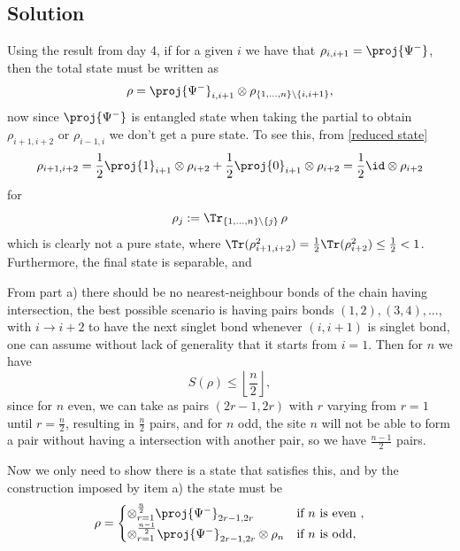 \subsection*{Solution}

\begin{solution}[Part (a)]
Using the result from day 4, if for a given $i$ we have that $\rho_{i,i+1}=\proj{\Psi^{-}}$, then the total state must be written as \begin{equation}
    \rho = \proj{\Psi^{-}}_{i,i+1} \otimes \rho_{\{1,\dots,n\}\setminus\{i,i+1\}},
    \label{reduced state}
\end{equation} now since $\proj{\Psi^{-}}$ is entangled state when taking the partial to obtain $\rho_{i+1,i+2}$ or $\rho_{i-1,i}$ we don't get a pure state. To see this, from \eqref{reduced state}
\begin{equation}
    \rho_{i+1,i+2} = \frac{1}{2}\proj{1}_{i+1} \otimes \rho_{i+2} + \frac{1}{2}\proj{0}_{i+1} \otimes \rho_{i+2} = \frac{1}{2} \id \otimes \rho_{i+2} 
\end{equation}
for 
\[
  \rho_{j}:=\Tr_{\{1,\dots,n\}\setminus\{j\}}\,\rho
\]
which is clearly not a pure state, where $\Tr(\rho_{i+1,i+2}^2) = \frac{1}{2}\Tr(\rho_{i+2}^2) \leq \frac{1}{2} < 1$. Furthermore, the final state is separable, and 


\end{solution}

\begin{solution}[Part (b)]

From part a) there should be no nearest-neighbour bonds of the chain having intersection, the best possible scenario is having pairs bonds $(1,2),(3,4),...$, with $i\rightarrow i+2$ to have the next singlet bond whenever $(i,i+1)$ is singlet bond, one can assume without lack of generality that it starts from $i=1$. Then for $n$ we have 
$$S(\rho) \leq \left\lfloor \frac{n}{2} \right\rfloor,$$
since for $n$ even, we can take as pairs $(2r-1,2r)$ with $r$ varying from $r=1$ until $r=\frac{n}{2}$, resulting in $\frac{n}{2}$ pairs, and for $n$ odd, the site $n$ will not be able to form a pair without having a intersection with another pair, so we have $\frac{n-1}{2}$ pairs.

Now we only need to show there is a state that satisfies this, and by the construction imposed by item a) the state must be 
\begin{equation}
    \rho =  \begin{cases} 
\otimes_{r=1}^{\frac{n}{2}} \proj{\Psi^{-}}_{2r-1,2r} & \text{if } n \text{ is even }, \\
\otimes_{r=1}^{\frac{n-1}{2}} \proj{\Psi^{-}}_{2r-1,2r} \otimes \rho_n & \text{if } n \text{ is odd},
\end{cases} 
\end{equation}

\end{solution}


